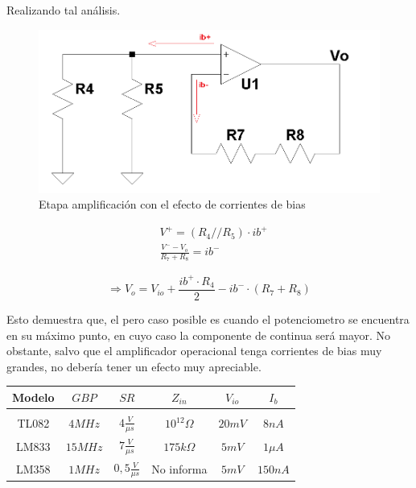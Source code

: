 Realizando tal an\'alisis.

\begin{figure}[H]
    \centering
    \includegraphics[scale=0.35]{../EJ5/Recursos/circuito_bias.PNG}
    \caption{Etapa amplificaci\'on con el efecto de corrientes de bias}
    \label{fig:pedal_bias}
\end{figure}

\begin{align*}
    & V^{+} = (R_4 // R_5) \cdot ib^{+} \\
    & \frac{V^{-} - V_o}{R_7 + R_8} = ib^{-}
\end{align*}

\begin{equation}
    \Rightarrow V_o = V_{io} + \frac{ib^{+} \cdot R_4}{2} - ib^{-} \cdot (R_7 + R_8)
\end{equation}

Esto demuestra que, el pero caso posible es cuando el potenciometro se encuentra en su m\'aximo punto, en cuyo caso la componente de continua
ser\'a mayor. No obstante, salvo que el amplificador operacional tenga corrientes de bias muy grandes, no deber\'ia tener un efecto muy apreciable.

\begin{table}[H]
    \centering
    \begin{tabular}{c c c c c c}
       Modelo & $GBP$ & $SR$ & $Z_{in}$ & $V_{io}$ & $I_{b}$ \\
       \hline \\
       TL082 & $4MHz$ & $4 \frac{V}{\mu s}$ & $10^{12} \Omega$ & $20mV$ & $8nA$ \\
       LM833 & $15MHz$ & $7 \frac{V}{\mu s}$ & $175k \Omega$ & $5mV$ & $1\mu A$ \\
       LM358 & $1MHz$ & $0,5 \frac{V}{\mu s}$ & No informa & $5mV$ & $150nA$ \\
       \hline
    \end{tabular}
\end{table}

